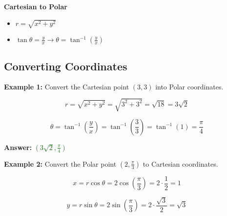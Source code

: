 \documentclass[10pt]{article}                               %
\begin{document}
\begin{adjustwidth}{2em}{0pt}
\begin{adjustwidth}{2em}{0pt}
        \vspace{0.5em}

        \textbf{Cartesian to Polar}

        \begin{itemize}
            \item \( r = \sqrt{x^2 + y^2} \)
            \item \( \tan\theta = \frac{y}{x}  \rightarrow  \theta = \tan^{-1}\left(\frac{y}{x}\right) \)
        \end{itemize}

        \vspace{0.5em}


        \begin{examplebox}

            \subsection*{Converting Coordinates}

            \textbf{Example 1:} Convert the Cartesian point \( \left(3,3\right) \) into Polar coordinates.
            \vspace{0.5em}

            \begin{adjustwidth}{2em}{0pt}

                \[ r = \sqrt{x^2 + y^2} = \sqrt{3^2 + 3^2} = \sqrt{18} = 3\sqrt{2} \]

                \[ \theta = \tan^{-1}\left(\frac{y}{x}\right) = \tan^{-1}\left(\frac{3}{3}\right) = \tan^{-1}(1) = \frac{\pi}{4} \]

                \textbf{Answer:} \textcolor{darkgreen}{\( \left(3\sqrt{2}, \frac{\pi}{4}\right) \)}

            \end{adjustwidth}

            \vspace{1em}

            \textbf{Example 2:} Convert the Polar point \( \left(2, \frac{\pi}{3}\right) \) to Cartesian coordinates.
            \vspace{0.5em}

            \begin{adjustwidth}{2em}{0pt}

                \[ x = r\cos\theta = 2\cos\left(\frac{\pi}{3}\right) = 2 \cdot \frac{1}{2} = 1 \]

                \[ y = r\sin\theta = 2\sin\left(\frac{\pi}{3}\right) = 2 \cdot \frac{\sqrt{3}}{2} = \sqrt{3} \]


\end{adjustwidth}
\end{examplebox}
\end{adjustwidth}
\end{adjustwidth}
\end{document}
